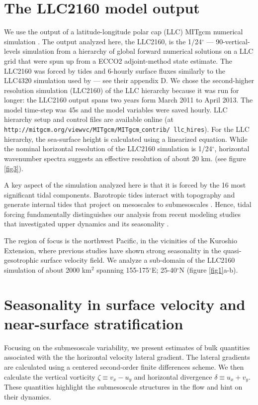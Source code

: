 \documentclass[grl]{agutex2015}
\begin{document}
\begin{article}
\section{The LLC2160 model output}
We use the output of a latitude-longitude polar cap (LLC)
MITgcm  numerical simulation  \citep{forget_etal2015}. The output analyzed here, the LLC2160,
is the 1/24$^\circ$ --- 90-vertical-levels simulation from a hierarchy of global
forward numerical solutions on a LLC grid that were
spun up from a ECCO2 adjoint-method state estimate. The LLC2160 was forced by
tides and 6-hourly surface fluxes similarly to the LLC4320 simulation
used by \citet{rocha_etal2016} --- see their appendix D. We chose the second-higher
resolution  simulation (LLC2160) of the LLC hierarchy because it was run for longer:
the LLC2160 output spans two years form March 2011 to April 2013. The model time-step
was 45s and the model variables were saved hourly. LLC hierarchy setup
and control files are available online
(at \texttt{http://mitgcm.org/viewvc/MITgcm/MITgcm$\_$contrib/
llc$\_$hires}). For the LLC hierarchy, the sea-surface height is calculated
using a linearized equation. While the nominal horizontal resolution  of the
LLC2160 simulation is 1/24$^\circ$,
 horizontal wavenumber spectra suggests an effective resolution of about 20 km.
 (see figure \ref{fig3}).

A key aspect of the simulation analyzed here is that it is forced by
the 16 most significant tidal components.
Barotropic tides interact with topography and generate internal
tides that project on mesoscales to submesoscales
\citep{rocha_etal2016}. Hence, tidal forcing fundamentally distinguishes our analysis
from recent modeling studies that investigated upper dynamics
and its seasonality \citep{sasaki_etal2014,qiu_etal2014}.

The region of focus is the northwest Pacific, in the vicinities of the Kuroshio
Extension, where previous studies have
shown strong seasonality in the quasi-gesotrophic surface velocity field.
We analyze a sub-domain of the LLC2160 simulation of about 2000 km$^2$
spanning 155-175$^\circ$E; 25-40$^\circ$N (figure \ref{fig1}a-b).

\section{Seasonality in surface velocity and near-surface stratification}

Focusing on the submesoscale variability, we present estimates of bulk quantities
associated with the the horizontal velocity lateral gradient.
The lateral gradients are calculated using a centered
second-order finite differences scheme. We then calculate
the vertical vorticity $\zeta \equiv v_x - u_y$ and
horizontal divergence $\delta \equiv u_x + v_y$.
These quantities highlight the submesoscale structures in the flow
and hint on their dynamics.


\end{article}
\end{document}
